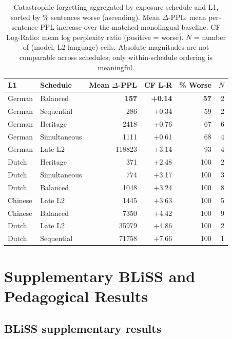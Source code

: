 \begin{table}[!ht]
  \centering \small
  \caption{Catastrophic forgetting aggregated by exposure schedule and L1, sorted by \% sentences worse (ascending). Mean $\Delta$-PPL: mean per-sentence PPL increase over the matched monolingual baseline. CF Log-Ratio: mean log perplexity ratio (positive = worse). $N$ = number of (model, L2-language) cells. Absolute magnitudes are not comparable across schedules; only within-schedule ordering is meaningful.}
  \label{tab:forgetting}
  \begin{tabular}{llrrrr}
    \toprule
    L1 & Schedule & Mean $\Delta$-PPL & CF L-R & \% Worse & $N$ \\
    \midrule
    German  & Balanced     & \textbf{157} & \textbf{+0.14} & \textbf{57} & 2 \\
    German  & Sequential   & 286   & +0.34 & 59  & 2 \\
    German  & Heritage     & 2418  & +0.76 & 67  & 6 \\
    German  & Simultaneous & 1111  & +0.61 & 68  & 4 \\
    German  & Late L2      & 118823 & +3.14 & 93 & 4 \\
    Dutch   & Heritage     & 371   & +2.48 & 100 & 2 \\
    Dutch   & Simultaneous & 774   & +3.17 & 100 & 3 \\
    Dutch   & Balanced     & 1048  & +3.24 & 100 & 8 \\
    Chinese & Late L2      & 1445  & +3.63 & 100 & 5 \\
    Chinese & Balanced     & 7350  & +4.42 & 100 & 9 \\
    Dutch   & Late L2      & 35979 & +4.86 & 100 & 2 \\
    Dutch   & Sequential   & 71758 & +7.66 & 100 & 1 \\
    \bottomrule
  \end{tabular}
\end{table}
 
 
\section{Supplementary BLiSS and Pedagogical Results}\label{sec:supp-results}
 
\subsection{BLiSS supplementary results}\label{appcomp:bliss}
 
